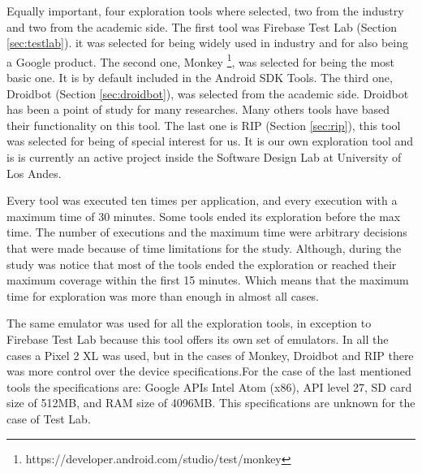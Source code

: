 Equally important, four exploration tools where selected, two from the industry and two from the academic side. The first tool was Firebase Test Lab (Section \ref{sec:testlab}). it was selected for being widely used in industry and for also being a Google product. The second one, Monkey \footnote{https://developer.android.com/studio/test/monkey}, was selected for being the most basic one. It is by default included in the Android SDK Tools. The third one, Droidbot (Section \ref{sec:droidbot}), was selected from the academic side. Droidbot has been a point of study for many researches. Many others tools have based their functionality on this tool. The last one is RIP (Section \ref{sec:rip}), this tool was selected for being of special interest for us. It is our own exploration tool and is is currently an active project inside the Software Design Lab at University of Los Andes. 

Every tool was executed ten times per application, and every execution with a maximum time of 30 minutes. Some tools ended its exploration before the max time. 
The number of executions and the maximum time were arbitrary decisions that were made because of time limitations for the study. Although, during the study was notice that most of the tools ended the exploration or reached their maximum coverage within the first 15 minutes. Which means that the maximum time for exploration was more than enough in almost all cases. 

The same emulator was used for all the exploration tools, in exception to Firebase Test Lab because this tool offers its own set of emulators. In all the cases a Pixel 2 XL was used, but in the cases of Monkey, Droidbot and RIP there was more control over the device specifications.For the case of the last mentioned tools the specifications are: Google APIs Intel Atom (x86), API level 27, SD card size of 512MB, and RAM size of 4096MB. This specifications are unknown for the case of Test Lab.

